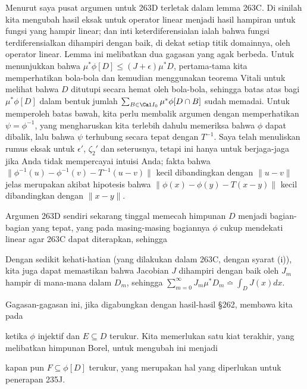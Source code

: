 {Menurut saya pusat argumen untuk 263D terletak dalam lemma
263C.   Di sinilah kita mengubah hasil eksak untuk operator linear menjadi
hasil hampiran untuk fungsi yang hampir linear;  dan inti
keterdiferensialan ialah bahwa fungsi terdiferensialkan dihampiri dengan baik,
di dekat setiap titik domainnya, oleh operator linear.
Lemma ini melibatkan dua gagasan yang agak berbeda.   Untuk menunjukkan
bahwa $\mu^*\phi[D]\le(J+\epsilon)\mu^*D$, pertama-tama kita memperhatikan bola-bola
dan kemudian menggunakan teorema Vitali untuk melihat bahwa $D$ ditutupi
secara hemat oleh bola-bola, sehingga batas atas bagi $\mu^*\phi[D]$ dalam
bentuk jumlah $\sum_{B\in\Cal I_0}\mu^*\phi[D\cap B]$ sudah memadai.
Untuk memperoleh batas bawah, kita perlu membalik argumen dengan memperhatikan
$\psi=\phi^{-1}$, yang mengharuskan kita terlebih dahulu memeriksa bahwa $\phi$
dapat dibalik, lalu bahwa $\psi$ terhubung secara tepat dengan $T^{-1}$.
Saya telah menuliskan rumus eksak untuk $\epsilon'$, $\zeta_2'$ dan seterusnya,
tetapi ini hanya untuk berjaga-jaga jika Anda tidak mempercayai intuisi Anda;  fakta bahwa
$\|\phi^{-1}(u)-\phi^{-1}(v)-T^{-1}(u-v)\|$ kecil dibandingkan dengan
$\|u-v\|$ jelas merupakan akibat hipotesis bahwa
$\|\phi(x)-\phi(y)-T(x-y)\|$ kecil dibandingkan dengan $\|x-y\|$.

Argumen 263D sendiri sekarang tinggal memecah himpunan $D$ menjadi
bagian-bagian yang tepat, yang pada masing-masing bagiannya $\phi$ cukup
mendekati linear agar 263C dapat diterapkan, sehingga


\noindent Dengan sedikit kehati-hatian (yang dilakukan dalam 263C, dengan syarat (i)),
kita juga dapat memastikan bahwa Jacobian $J$
dihampiri dengan baik oleh $J_m$ hampir di mana-mana dalam $D_m$, sehingga
$\sum_{m=0}^{\infty}J_m\mu^*D_m\bumpeq\int_DJ(x)dx$.

Gagasan-gagasan ini, jika digabungkan dengan hasil-hasil \S262, membawa kita
pada


\noindent ketika $\phi$ injektif dan $E\subseteq D$ terukur.
Kita memerlukan satu kiat terakhir, yang melibatkan himpunan Borel, untuk
mengubah ini menjadi


\noindent kapan pun $F\subseteq\phi[D]$ terukur, yang merupakan hal yang
diperlukan untuk penerapan 235J.

}
